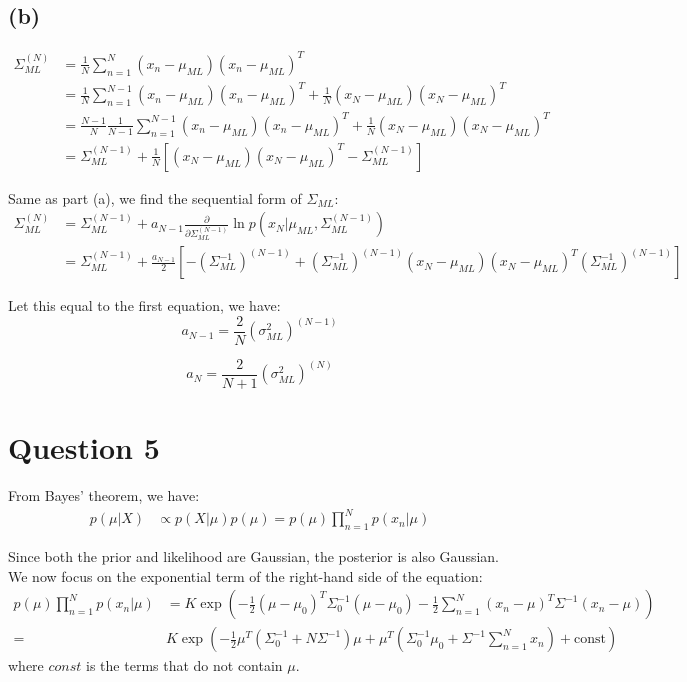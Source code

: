 \documentclass[a4paper,12pt]{article}
\newcommand{\pard}[2]{\frac{\partial #1}{\partial #2}}
\begin{document}
\subsection*{(b)}

\begin{align*}
	\Sigma_{ML}^(N) &= \frac{1}{N}\sum_{n=1}^{N}(x_n - \mu_{ML})(x_n - \mu_{ML})^T \\
	&= \frac{1}{N}\sum_{n=1}^{N-1}(x_n - \mu_{ML})(x_n - \mu_{ML})^T + \frac{1}{N}(x_N - \mu_{ML})(x_N - \mu_{ML})^T \\
	&= \frac{N-1}{N}\frac{1}{N-1}\sum_{n=1}^{N-1}(x_n - \mu_{ML})(x_n - \mu_{ML})^T + \frac{1}{N}(x_N - \mu_{ML})(x_N - \mu_{ML})^T \\
	&= \Sigma_{ML}^{(N-1)} + \frac{1}{N}[(x_N - \mu_{ML})(x_N - \mu_{ML})^T - \Sigma_{ML}^{(N-1)}]
\end{align*}

Same as part (a), we find the sequential form of $\Sigma_{ML}$:
\begin{align*}
	\Sigma_{ML}^{(N)} &= \Sigma_{ML}^{(N-1)} + a_{N-1}\pard{}{\Sigma_{ML}^{(N-1)}}\ln p(x_N|\mu_{ML}, \Sigma_{ML}^{(N-1)}) \\
	&= \Sigma_{ML}^{(N-1)} + \frac{a_{N-1}}{2} [-(\Sigma_{ML}^{-1})^{(N-1)} + (\Sigma_{ML}^{-1})^{(N-1)}(x_N - \mu_{ML})(x_N - \mu_{ML})^T(\Sigma_{ML}^{-1})^{(N-1)}]
\end{align*}

Let this equal to the first equation, we have:
\begin{equation*}
	a_{N-1} = \frac{2}{N} (\sigma^2_{ML})^{(N-1)}
\end{equation*}

\begin{equation*}
	a_{N} = \frac{2}{N+1} (\sigma^2_{ML})^{(N)}
\end{equation*}

\section*{Question 5}

From Bayes' theorem, we have:
\begin{align*}
	p(\mu|X) &\propto p(X|\mu)p(\mu) = p(\mu) \prod_{n=1}^{N}p(x_n|\mu)
\end{align*}

Since both the prior and likelihood are Gaussian, the posterior is also Gaussian. We now focus on the exponential term of the right-hand side of the equation:
\begin{align*}
	p(\mu) \prod_{n=1}^{N}p(x_n|\mu) &= K \exp\left(-\frac{1}{2}(\mu - \mu_0)^T\Sigma_0^{-1}(\mu - \mu_0) - \frac{1}{2}\sum_{n=1}^{N}(x_n - \mu)^T\Sigma^{-1}(x_n - \mu)\right) \\
	=& K \exp\left(-\frac{1}{2}\mu^T(\Sigma_0^{-1} + N\Sigma^{-1})\mu + \mu^T(\Sigma_0^{-1}\mu_0 + \Sigma^{-1}\sum_{n=1}^{N}x_n) + \text{const}\right)
\end{align*}
where $const$ is the terms that do not contain $\mu$.
\end{document}
